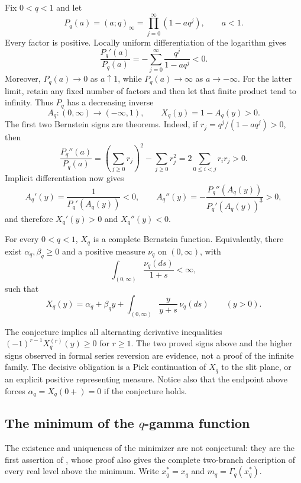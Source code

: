 Fix \(0<q<1\) and let
\[
 P_q(a)=(a;q)_\infty=\prod_{j=0}^{\infty}(1-aq^j),
 \qquad a<1.
\]
Every factor is positive.  Locally uniform differentiation of the logarithm
gives
\[
 \frac{P_q'(a)}{P_q(a)}
  =-\sum_{j=0}^{\infty}\frac{q^j}{1-aq^j}<0.
\]
Moreover, \(P_q(a)\to0\) as \(a\uparrow1\), while
\(P_q(a)\to\infty\) as \(a\to-\infty\).  For the latter limit, retain any
fixed number of factors and then let that finite product tend to infinity.
Thus \(P_q\) has a decreasing inverse
\[
 A_q:(0,\infty)\longrightarrow(-\infty,1),
 \qquad
 X_q(y)=1-A_q(y)>0.
\]
The first two Bernstein signs are theorems.  Indeed, if
\(r_j=q^j/(1-aq^j)>0\), then
\[
 \frac{P_q''(a)}{P_q(a)}
  =\left(\sum_{j\ge0}r_j\right)^2-\sum_{j\ge0}r_j^2
  =2\sum_{0\le i<j}r_ir_j>0.
\]
Implicit differentiation now gives
\[
 A_q'(y)=\frac1{P_q'(A_q(y))}<0,\qquad
 A_q''(y)
  =-\frac{P_q''(A_q(y))}{P_q'(A_q(y))^3}>0,
\]
and therefore \(X_q'(y)>0\) and \(X_q''(y)<0\).

\begin{conjecture}
\label{conj:complete-bernstein-principal-inverse}
For every \(0<q<1\), \(X_q\) is a complete Bernstein function.  Equivalently,
there exist \(\alpha_q,\beta_q\ge0\) and a positive measure \(\nu_q\) on
\((0,\infty)\), with
\[
 \int_{(0,\infty)}\frac{\nu_q(ds)}{1+s}<\infty,
\]
such that
\[
 X_q(y)=\alpha_q+\beta_qy+
        \int_{(0,\infty)}\frac{y}{y+s}\,\nu_q(ds)
 \qquad (y>0).
\]
\end{conjecture}

The conjecture implies all alternating derivative inequalities
\((-1)^{r-1}X_q^{(r)}(y)\ge0\) for \(r\ge1\).  The two proved signs above and
the higher signs observed in formal series reversion are evidence, not a
proof of the infinite family.  The decisive obligation is a Pick continuation
of \(X_q\) to the slit plane, or an explicit positive representing measure.
Notice also that the endpoint above forces
\(\alpha_q=X_q(0+)=0\) if the conjecture holds.

\subsection{\texorpdfstring{The minimum of the \(q\)-gamma function}{The minimum of the q-gamma function}}

The existence and uniqueness of the minimizer are not conjectural: they are
the first assertion of , whose proof also gives the
complete two-branch description of every real level above the minimum.  Write
$x_q^\ast=x_q$ and \(m_q=\Gamma_q(x_q^\ast)\).

